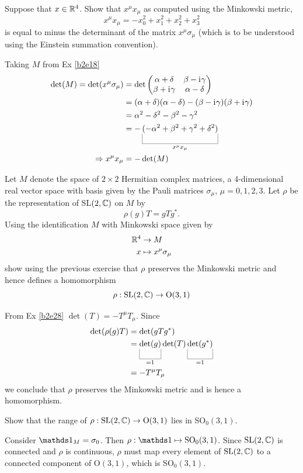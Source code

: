 \documentclass[10pt]{article}
\begin{document}
\begin{example}\label{b2e28}
	Suppose that $x \in \mathbb{R}^4$. Show that $x^\mu x_\mu$ as computed using the Minkowski metric,
	$$
	x^\mu x_\mu = -x_0^2 + x_1^2 + x_2^2 + x_3^2
	$$
	is equal to minus the determinant of the matrix $x^\mu \sigma_\mu$ (which is to be understood using the Einstein summation convention).
\end{example}
\sol Taking $M$ from Ex \ref{b2e18}
$$
\begin{aligned}
	\det (M) = \det(x^\mu \sigma_\mu) &= \det\begin{pmatrix}
		\alpha+\delta&\beta-\di\gamma\\\beta+\di\gamma&\alpha-\delta
	\end{pmatrix}\\
	&= (\alpha+\delta)(\alpha-\delta)-(\beta-\di\gamma)(\beta+\di\gamma)\\
	&= \alpha^2-\delta^2-\beta^2-\gamma^2\\
	&= -\ub{(-\alpha^2+\beta^2+\gamma^2+\delta^2)}{x^\mu x_\mu}\\
	\Rightarrow x^\mu x_\mu &= -\det(M)
\end{aligned}
$$


\begin{example}\label{b2e29}
	Let $M$ denote the space of $2\times2$ Hermitian complex matrices, a 4-dimensional real vector space with basis given by the Pauli matrices $\sigma_\mu$, $\mu=0,1,2,3$. Let $\rho$ be the representation of SL$(2,\mathbb{C})$ on $M$ by
	$$
	\rho(g)T=gTg^*.
	$$
	Using the identification $M$ with Minkowski space given by
	$$
	\begin{aligned}
		\mathbb{R}^4 &\to M\\
		x &\mapsto x^\mu \sigma_\mu
	\end{aligned}
	$$
	show using the previous exercise that $\rho$ preserves the Minkowski metric and hence defines a homomorphism
	$$
	\rho:\text{SL}(2,\mathbb{C})\to \text{O}(3,1)
	$$
\end{example}
\sol From Ex \ref{b2e28} $\det (T) = -T^\mu T_\mu$. Since
$$
\begin{aligned}
	\det(\rho(g) T) &= \det(gTg^*)\\
	&= \ub{\det(g)}{=1}\det(T)\ub{\det(g^*)}{=1}\\
	&= -T^\mu T_\mu
\end{aligned}
$$
we conclude that $\rho$ preserves the Minkowski metric and is hence a homomorphism.


\begin{example}
	Show that the range of $\rho:\text{SL}(2,\mathbb{C})\to\text{O}(3,1)$ lies in SO$_0(3,1)$.
\end{example}
\sol Consider $\id_M = \sigma_0$. Then $\rho:\id\mapsto\SO_0(3,1)$. Since $\text{SL}(2,\mathbb{C})$ is connected and $\rho$ is continuous, $\rho$ must map every element of $\text{SL}(2,\mathbb{C})$ to a connected component of $\text{O}(3,1)$, which is SO$_0(3,1)$.
\end{document}

